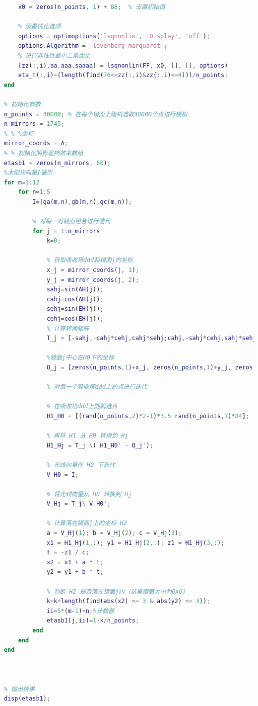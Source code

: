 \documentclass[withoutpreface,bwprint]{cumcmthesis} %
\begin{document}
\begin{appendices}
\begin{lstlisting}[language=Matlab]
    % 初始猜测值
    x0 = zeros(n_points, 1) + 88;  % 设置初始值

    % 设置优化选项
    options = optimoptions('lsqnonlin', 'Display', 'off');
    options.Algorithm = 'levenberg-marquardt';
    % 进行非线性最小二乘优化
    [zz(:,i),aa,aaa,saaaa] = lsqnonlin(FF, x0, [], [], options)
    eta_t(:,i)=(length(find(76<=zz(:,i)&zz(:,i)<=4)))/n_points;
end

% 初始化参数
n_points = 30000; % 在每个镜面上随机选取30000个点进行模拟
n_mirrors = 1745;
% % %坐标
mirror_coords = A;
% % 初始化阴影遮挡效率数组
etasb1 = zeros(n_mirrors, 60);
%太阳光向量I遍历
for m=1:12
    for n=1:5
        I=[ga(m,n),gb(m,n),gc(m,n)];

        % 对每一对镜面组合进行迭代
        for j = 1:n_mirrors
            k=0;

            % 获取吸收塔ddd和镜面j的坐标
            x_j = mirror_coords(j, 1);
            y_j = mirror_coords(j, 2);
            sahj=sin(AH(j));
            cahj=cos(AH(j));
            sehj=sin(EH(j));
            cehj=cos(EH(j));
            % 计算转换矩阵
            T_j = [-sahj,-cahj*cehj,cahj*sehj;cahj,-sahj*cehj,sahj*sehj;0,sehj,cehj];

            %镜面j中心在H0下的坐标
            O_j = [zeros(n_points,1)+x_j, zeros(n_points,1)+y_j, zeros(n_points,1)+4];

            % 对每一个吸收塔ddd上的点进行迭代

            % 在吸收塔ddd上随机选点
            H1_H0 = [(rand(n_points,2)*2-1)*3.5 rand(n_points,1)*84];

            % 再将 H1 从 H0 转换到 Hj
            H1_Hj = T_j \( H1_H0' - O_j');

            % 光线向量在 H0 下迭代
            V_H0 = I;

            % 将光线向量从 H0 转换到 Hj
            V_Hj = T_j\ V_H0';

            % 计算落在镜面j上的坐标 H2
            a = V_Hj(1); b = V_Hj(2); c = V_Hj(3);
            x1 = H1_Hj(1,:); y1 = H1_Hj(2,:); z1 = H1_Hj(3,:);
            t = -z1 / c;
            x2 = x1 + a * t;
            y2 = y1 + b * t;

            % 判断 H2 是否落在镜面j内（这里镜面大小为6x6）
            k=k+length(find(abs(x2) <= 3 & abs(y2) <= 3));
            ii=5*(m-1)+n;%计数器
            etasb1(j,ii)=1-k/n_points;
        end
    end
end



% 输出结果
disp(etasb1);


\end{lstlisting}
\end{appendices}
\end{document}
